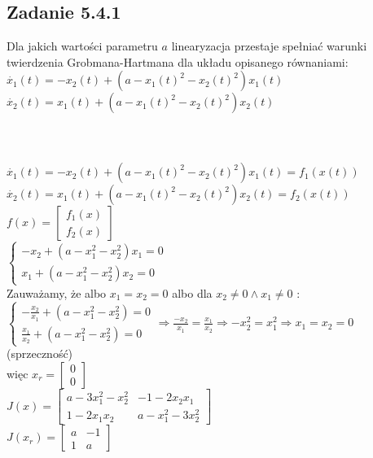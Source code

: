 \subsection*{Zadanie 5.4.1} {\color{darkgray}
	Dla jakich wartości parametru $a$ linearyzacja przestaje spełniać warunki twierdzenia Grobmana-Hartmana dla układu opisanego równaniami:\\
	$\dot{x_1}(t)=-x_2(t)+(a-x_1(t)^2-x_2(t)^2)x_1(t)$\\
	$\dot{x_2}(t)=x_1(t)+(a-x_1(t)^2-x_2(t)^2)x_2(t)$\\\\
}\lineh
\\\\
$\dot{x_1}(t)=-x_2(t)+(a-x_1(t)^2-x_2(t)^2)x_1(t)=f_1(x(t))$\\
$\dot{x_2}(t)=x_1(t)+(a-x_1(t)^2-x_2(t)^2)x_2(t)=f_2(x(t))$\\
$f(x)=\left[ \begin{array}{c}     f_1(x) \\ f_2(x)   \end{array}\right]$\\
$\begin{cases} -x_2+(a-x_1^2-x_2^2)x_1=0 \\ x_1+(a-x_1^2-x_2^2)x_2=0\end{cases}  $\\
Zauważamy, że albo $x_1=x_2=0$ albo dla $x_2 \neq 0 \wedge x_1 \neq 0$ :\\
$\begin{cases} -\frac{x_2}{x_1}+(a-x_1^2-x_2^2)=0 \\ \frac{x_1}{x_2}+(a-x_1^2-x_2^2)=0\end{cases}  \Rightarrow \frac{-x_2}{x_1} = \frac{x_1}{x_2} \Rightarrow -x_2^2=x_1^2 \Rightarrow x_1=x_2=0$ (sprzeczność)\\
więc $x_r=\left[ \begin{array}{c}     0\\0   \end{array}\right]$\\
$J(x)=\left[ \begin{array}{cc}   a-3x_1^2-x_2^2 & -1-2x_2x_1 \\ 1-2x_1x_2 & a-x_1^2-3x_2^2    \end{array}\right]$\\
$J(x_r)=\left[ \begin{array}{cc}    a & -1 \\ 1 & a    \end{array}\right]$\\
